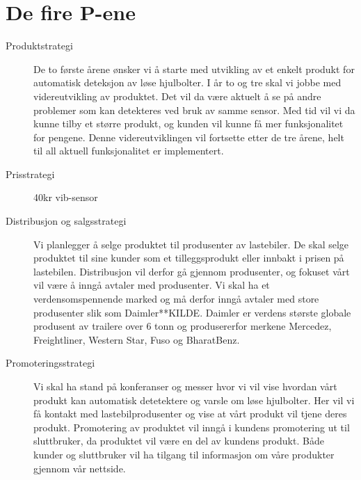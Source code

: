 \section{De fire P-ene}
\begin{description}
	\item[Produktstrategi] De to første årene ønsker vi å starte med utvikling av et enkelt produkt for 		automatisk deteksjon av løse hjulbolter. I år to og tre skal vi jobbe med videreutvikling av 				produktet. Det vil da være aktuelt å se på andre problemer som kan detekteres ved bruk av 			samme sensor. Med tid vil vi da kunne tilby et større produkt, og kunden vil kunne få mer 			funksjonalitet for pengene. Denne videreutviklingen vil fortsette etter de tre årene, helt til all aktuell 		funksjonalitet er implementert.
	\item[Prisstrategi] 40kr vib-sensor
	\item[Distribusjon og salgsstrategi] Vi planlegger å selge produktet til produsenter av lastebiler. De 		skal selge produktet til sine kunder som et tilleggsprodukt eller innbakt i prisen på lastebilen. 			Distribusjon vil derfor gå gjennom produsenter, og fokuset vårt vil være å inngå avtaler med 			produsenter. Vi skal ha et verdensomspennende marked og må derfor inngå avtaler med store 		produsenter slik som Daimler**KILDE. Daimler er verdens største globale produsent av 				trailere over 6 tonn og produsererfor merkene Mercedez, Freightliner, Western Star, Fuso og 			BharatBenz.
	\item[Promoteringsstrategi] Vi skal ha stand på konferanser og messer hvor vi vil vise hvordan vårt 	produkt kan automatisk detetektere og varsle om løse hjulbolter. Her vil vi få kontakt med 			lastebilprodusenter og vise at vårt produkt vil tjene deres produkt. Promotering av produktet vil 		inngå i kundens promotering ut til sluttbruker, da produktet vil være en del av kundens produkt. 		Både kunder og 	sluttbruker vil ha tilgang til informasjon om våre produkter gjennom vår nettside.
\end{description}